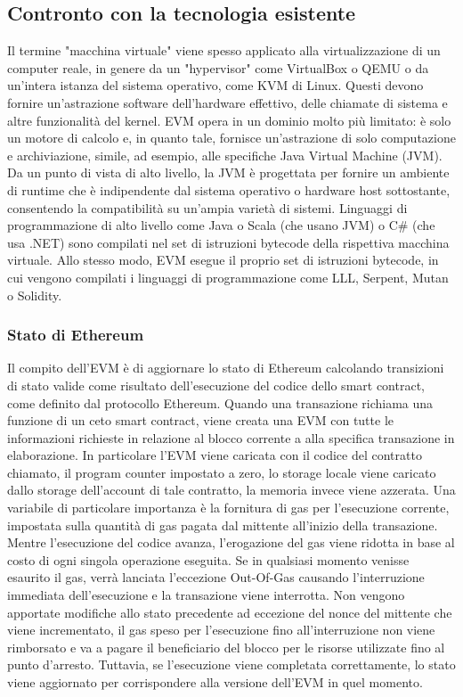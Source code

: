 \subsection*{Contronto con la tecnologia esistente}
Il termine "macchina virtuale" viene spesso applicato alla virtualizzazione di un computer reale, in genere da un "hypervisor" come VirtualBox o QEMU o da un'intera istanza del sistema operativo, come KVM di Linux. Questi devono fornire un'astrazione software dell'hardware effettivo, delle chiamate di sistema e altre funzionalità del kernel. EVM opera in un dominio molto più limitato: è solo un motore di calcolo e, in quanto tale, fornisce un'astrazione di solo computazione e archiviazione, simile, ad esempio, alle specifiche Java Virtual Machine (JVM). Da un punto di vista di alto livello, la JVM è progettata per fornire un ambiente di runtime che è indipendente dal sistema operativo o hardware host sottostante, consentendo la compatibilità su un'ampia varietà di sistemi. Linguaggi di programmazione di alto livello come Java o Scala (che usano JVM) o C\# (che usa .NET) sono compilati nel set di istruzioni bytecode della rispettiva macchina virtuale. Allo stesso modo, EVM esegue il proprio set di istruzioni bytecode, in cui vengono compilati i linguaggi di programmazione come LLL, Serpent, Mutan o Solidity.

\subsubsection{Stato di Ethereum}
Il compito dell'EVM è di aggiornare lo stato di Ethereum calcolando transizioni di stato valide come risultato dell'esecuzione del codice dello smart contract, come definito dal protocollo Ethereum. Quando una transazione richiama una funzione di un ceto smart contract, viene creata una EVM con tutte le informazioni richieste in relazione al blocco corrente a alla specifica transazione in elaborazione. In particolare l'EVM viene caricata con il codice del contratto chiamato, il program counter impostato a zero, lo storage locale viene caricato dallo storage dell'account di tale contratto, la memoria invece viene azzerata. Una variabile di particolare importanza è la fornitura di gas per l'esecuzione corrente, impostata sulla quantità di gas pagata dal mittente all'inizio della transazione. Mentre l'esecuzione del codice avanza, l'erogazione del gas viene ridotta in base al costo di ogni singola operazione eseguita. Se in qualsiasi momento venisse esaurito il gas, verrà lanciata l'eccezione Out-Of-Gas causando l'interruzione immediata dell'esecuzione e la transazione viene interrotta. Non vengono apportate modifiche allo stato precedente ad eccezione del nonce del mittente che viene incrementato, il gas speso per l'esecuzione fino all'interruzione non viene rimborsato e va a pagare il beneficiario del blocco per le risorse utilizzate fino al punto d'arresto. Tuttavia, se l'esecuzione viene completata correttamente, lo stato viene aggiornato per corrispondere alla versione dell'EVM in quel momento. 

